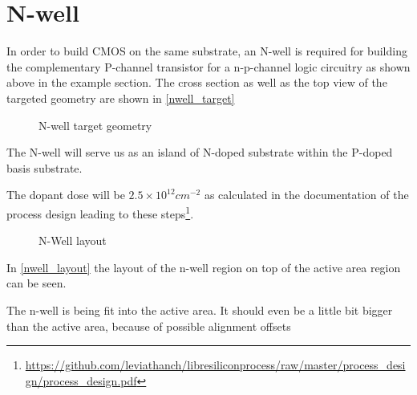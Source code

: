 \section{N-well}\label{nwell_chapter}
In order to build CMOS on the same substrate, an N-well is required for building the complementary P-channel transistor for a n-p-channel logic circuitry as shown above in the example section.
The cross section as well as the top view of the targeted geometry are shown in \autoref{nwell_target}
\begin{figure}[H]
	\centering
	\begin{tikzpicture}[node distance = 3cm, auto, thick,scale=\CrossAndTopSectionBig, every node/.style={transform shape}]
		
	\end{tikzpicture}
	\begin{tikzpicture}[node distance = 3cm, auto, thick,scale=\CrossAndTopSectionBig, every node/.style={transform shape}]
		
	\end{tikzpicture}
	\caption{N-well target geometry}
	\label{nwell_target}
\end{figure}

The N-well will serve us as an island of N-doped substrate within the P-doped basis substrate.

The dopant dose will be $2.5\times10^{12}cm^{-2}$ as calculated in the documentation of the process design leading to these steps\footnote{\url{https://github.com/leviathanch/libresiliconprocess/raw/master/process_design/process_design.pdf}}.

\begin{figure}[H]
	\centering
	\begin{tikzpicture}[node distance =1cm, auto, thick,scale=\VLSILayout, every node/.style={transform shape}]
		
	\end{tikzpicture}
	\caption{N-Well layout}
	\label{nwell_layout}
\end{figure}

In \autoref{nwell_layout} the layout of the n-well region on top of the active area region can be seen.

The n-well is being fit into the active area. It should even be a little bit bigger than the active area, because of possible alignment offsets

\newpage

